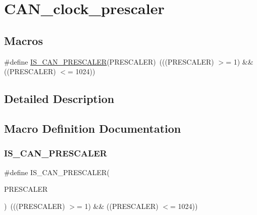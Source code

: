 \hypertarget{group___c_a_n__clock__prescaler}{}\section{C\+A\+N\+\_\+clock\+\_\+prescaler}
\label{group___c_a_n__clock__prescaler}
\subsection*{Macros}
\begin{DoxyCompactItemize}
\item 
\#define \mbox{\hyperlink{group___c_a_n__clock__prescaler_gacde6b8be6fe083a6302fc183b5ac1055}{I\+S\+\_\+\+C\+A\+N\+\_\+\+P\+R\+E\+S\+C\+A\+L\+ER}}(P\+R\+E\+S\+C\+A\+L\+ER)~(((P\+R\+E\+S\+C\+A\+L\+ER) $>$= 1) \&\& ((P\+R\+E\+S\+C\+A\+L\+ER) $<$= 1024))
\end{DoxyCompactItemize}


\subsection{Detailed Description}


\subsection{Macro Definition Documentation}
\mbox{\label{group___c_a_n__clock__prescaler_gacde6b8be6fe083a6302fc183b5ac1055}} 
\subsubsection{\texorpdfstring{IS\_CAN\_PRESCALER}{IS\_CAN\_PRESCALER}}
{\footnotesize\ttfamily \#define I\+S\+\_\+\+C\+A\+N\+\_\+\+P\+R\+E\+S\+C\+A\+L\+ER(\begin{DoxyParamCaption}\item[{}]{P\+R\+E\+S\+C\+A\+L\+ER }\end{DoxyParamCaption})~(((P\+R\+E\+S\+C\+A\+L\+ER) $>$= 1) \&\& ((P\+R\+E\+S\+C\+A\+L\+ER) $<$= 1024))}

